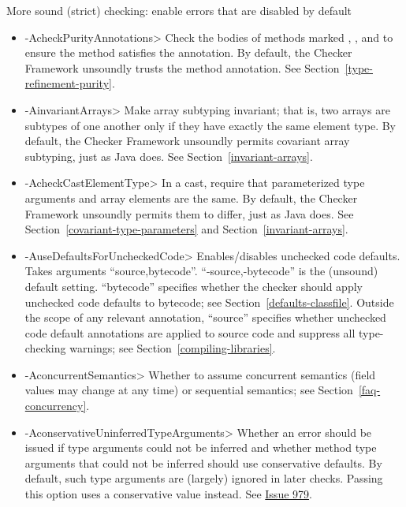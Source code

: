 \label{unsound-by-default}
More sound (strict) checking: enable errors that are disabled by default
\begin{itemize}
\item \<-AcheckPurityAnnotations>
  Check the bodies of methods marked
  ,
  ,
  and 
  to ensure the method satisfies the annotation.  By default,
  the Checker Framework unsoundly trusts the method annotation.  See
  Section~\ref{type-refinement-purity}.
\item \<-AinvariantArrays>
  Make array subtyping invariant; that is, two arrays are subtypes of one
  another only if they have exactly the same element type.  By default,
  the Checker Framework unsoundly permits covariant array subtyping, just
  as Java does.  See Section~\ref{invariant-arrays}.
\item \<-AcheckCastElementType>
  In a cast, require that parameterized type arguments and array elements
  are the same.  By default, the Checker Framework unsoundly permits them
  to differ, just as Java does.  See Section~\ref{covariant-type-parameters}
  and Section~\ref{invariant-arrays}.
\item \<-AuseDefaultsForUncheckedCode>
  Enables/disables unchecked code defaults.  Takes arguments ``source,bytecode''.
  ``-source,-bytecode'' is the (unsound) default setting.
  ``bytecode'' specifies
  whether the checker should apply unchecked code defaults to
  bytecode; see
  Section~\ref{defaults-classfile}.
  Outside the scope of any relevant
   annotation, ``source'' specifies whether unchecked code
  default annotations are applied to source code and suppress all type-checking warnings; see
  Section~\ref{compiling-libraries}.
\item \<-AconcurrentSemantics>
  Whether to assume concurrent semantics (field values may change at any
  time) or sequential semantics; see Section~\ref{faq-concurrency}.
\item \<-AconservativeUninferredTypeArguments>
  Whether an error should be issued if type arguments could not be inferred and
  whether method type arguments that could not be inferred should use
  conservative defaults.
  By default, such type arguments are (largely) ignored in later
  checks.
  Passing this option uses a conservative value instead.
  See \href{https://github.com/typetools/checker-framework/issues/979}{Issue
  979}.
\end{itemize}

